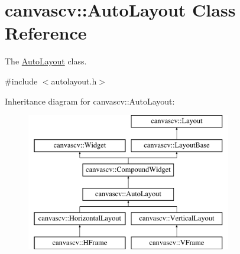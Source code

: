 \hypertarget{classcanvascv_1_1AutoLayout}{}\section{canvascv\+:\+:Auto\+Layout Class Reference}
\label{classcanvascv_1_1AutoLayout}


The \hyperlink{classcanvascv_1_1AutoLayout}{Auto\+Layout} class.  




{\ttfamily \#include $<$autolayout.\+h$>$}

Inheritance diagram for canvascv\+:\+:Auto\+Layout\+:\begin{figure}[H]
\begin{center}
\leavevmode
\includegraphics[height=6.000000cm]{classcanvascv_1_1AutoLayout}
\end{center}
\end{figure}
